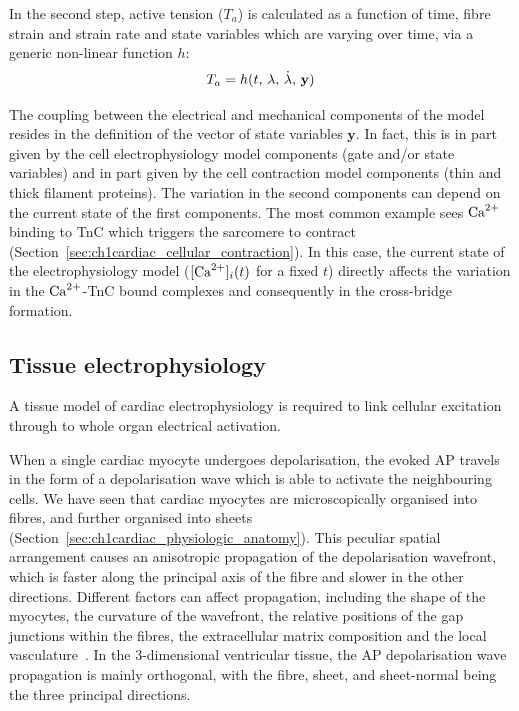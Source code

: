 \vspace{0.2cm}\noindent
In the second step, active tension ($T_a$) is calculated as a function of time, fibre strain and strain rate and state variables which are varying over time, via a generic non-linear function $h$:
%
\begin{equation}\label{eq:activetensioncalc}
    T_a = h(t,\, \lambda,\,\dot{\lambda},\,\mathbf{y}) \\
\end{equation}

\vspace{0.2cm}
The coupling between the electrical and mechanical components of the model resides in the definition of the vector of state variables $\mathbf{y}$. In fact, this is in part given by the cell electrophysiology model components (gate and/or state variables) and in part given by the cell contraction model components (thin and thick filament proteins). The variation in the second components can depend on the current state of the first components. The most common example sees $\textrm{Ca}^{2+}$ binding to TnC which triggers the sarcomere to contract (Section~\ref{sec:ch1cardiac_cellular_contraction}). In this case, the current state of the electrophysiology model ($[\textrm{Ca}^{2+}]_{i}(t)$ for a fixed $t$) directly affects the variation in the $\textrm{Ca}^{2+}$-TnC bound complexes and consequently in the cross-bridge formation.


%
%
%
\subsection{Tissue electrophysiology}\label{sec:tissue_ep_math_modelling}
A tissue model of cardiac electrophysiology is required to link cellular excitation through to whole organ electrical activation.

\vspace{0.2cm}
When a single cardiac myocyte undergoes depolarisation, the evoked AP travels in the form of a depolarisation wave which is able to activate the neighbouring cells. We have seen that cardiac myocytes are microscopically organised into fibres, and further organised into sheets (Section~\ref{sec:ch1cardiac_physiologic_anatomy}). This peculiar spatial arrangement causes an anisotropic propagation of the depolarisation wavefront, which is faster along the principal axis of the fibre and slower in the other directions. Different factors can affect propagation, including the shape of the myocytes, the curvature of the wavefront, the relative positions of the gap junctions within the fibres, the extracellular matrix composition and the local vasculature~\cite{Clayton:2011}. In the $3$-dimensional ventricular tissue, the AP depolarisation wave propagation is mainly orthogonal, with the fibre, sheet, and sheet-normal being the three principal directions.

